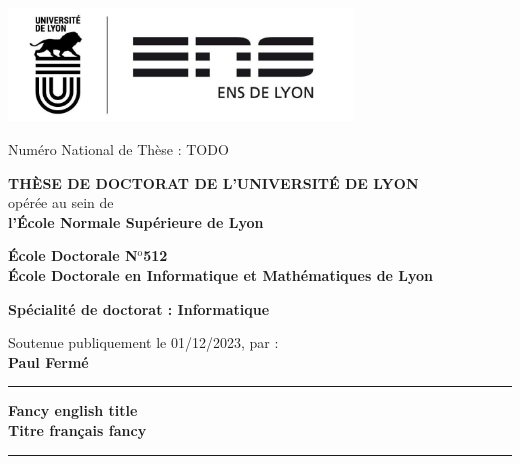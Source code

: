 \documentclass[11pt,a4paper]{book}
\begin{document}
\setlength{\parindent}{0pt}
\thispagestyle{empty}


\begin{center}
\includegraphics[height=3cm]{logo} %
\end{center}


\fontsize{11pt}{13pt}\selectfont
Numéro National de Thèse : TODO

\vspace{1cm}

\begin{center}
\fontsize{14pt}{16pt}\selectfont
\textbf{\uppercase{Thèse de doctorat de l'université de Lyon}}\\
\fontsize{12pt}{14pt}\selectfont
opérée au sein de\\
\textbf{l'École Normale Supérieure de Lyon}

\vspace{0.5cm}

\textbf{École Doctorale N$^{\mathrm{o}}$512\\%
École Doctorale en Informatique et Mathématiques de Lyon}%

\vspace{0.5cm}

\textbf{Spécialité de doctorat : Informatique\\
}


\vspace{1.5cm}

Soutenue publiquement le 01/12/2023, par :\\
\fontsize{14pt}{16pt}\selectfont
\textbf{Paul Fermé}

\vspace{1.5cm} %

\rule[20pt]{\textwidth}{0.5pt}

\fontsize{25pt}{28pt}\selectfont
\textbf{Fancy english title}\\[.5em]
\fontsize{18pt}{21pt}\selectfont
\textbf{Titre français fancy}

\rule{\textwidth}{0.5pt}

\vspace{1cm} %
\end{center}
\end{document}
